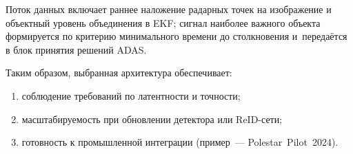 Поток данных включает раннее наложение радарных точек
на изображение и объектный уровень объединения в EKF;
сигнал наиболее важного объекта формируется по критерию
минимального времени до столкновения и~передаётся
в блок принятия решений ADAS.

Таким образом, выбранная архитектура обеспечивает:
\begin{enumerate}[label=\arabic*)]
  \item соблюдение требований по латентности и точности;
  \item масштабируемость при обновлении детектора или ReID-сети;
  \item готовность к промышленной интеграции (пример — Polestar Pilot 2024).
\end{enumerate}
